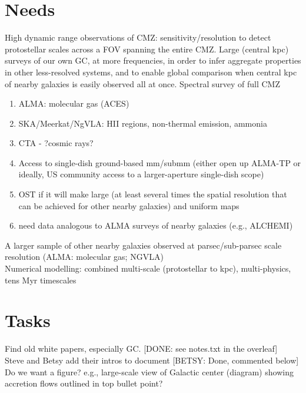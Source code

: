 \documentclass[modern]{aastex62}
\begin{document}
\section{Needs}
High dynamic range observations of CMZ: sensitivity/resolution to detect
protostellar scales across a FOV spanning the entire CMZ. Large (central kpc)
surveys of our own GC, at more frequencies, in order to infer aggregate
properties in other less-resolved systems, and to enable global comparison when
central kpc of nearby galaxies is easily observed all at once. Spectral survey
of full CMZ
\begin{enumerate}
    \item ALMA: molecular gas (ACES)
    \item SKA/Meerkat/NgVLA: HII regions, non-thermal emission, ammonia
    \item CTA - ?cosmic rays?
    \item Access to single-dish ground-based mm/submm  (either open up ALMA-TP or ideally, US community access to a larger-aperture single-dish scope)
    \item OST if it will make large (at least several times the spatial resolution that can be achieved for other nearby galaxies)  and uniform maps
    \item need data analogous to ALMA surveys of nearby galaxies (e.g., ALCHEMI)
\end{enumerate}
A larger sample of other nearby galaxies observed at parsec/sub-parsec scale resolution (ALMA: molecular gas; NGVLA)\\
Numerical modelling: combined multi-scale (protostellar to kpc), multi-physics, tens Myr timescales

\section{Tasks}
Find old white papers, especially GC.  [DONE: see notes.txt in the overleaf]\\
Steve and Betsy add their intros to document [BETSY: Done, commented below]\\


Do we want a figure?  e.g., large-scale view of Galactic center (diagram) showing accretion flows outlined in top bullet point? \\
\end{document}
